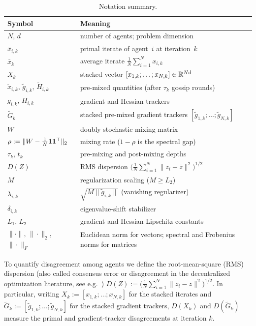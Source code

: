 \documentclass[review,onefignum,onetabnum]{siamart171218}
\begin{document}
	\begin{table}[htbp]
		\centering
		\caption{Notation summary.}
		\label{tab:notation}
		\setlength{\tabcolsep}{4pt}
		\footnotesize
		\begin{tabular}{@{}p{}p{}@{}}
			\toprule
			Symbol & Meaning \\
			\midrule
			$N$, $d$ & number of agents; problem dimension \\
			$x_{i,k}$ & primal iterate of agent~$i$ at iteration~$k$ \\
			$\bar x_k$ & average iterate $\frac1N\sum_{i=1}^N x_{i,k}$ \\
			$X_k$ & stacked vector $[x_{1,k};\dots;x_{N,k}]\in\mathbb{R}^{Nd}$ \\
			$\tilde x_{i,k}$, $\tilde g_{i,k}$, $\tilde H_{i,k}$ & pre-mixed quantities (after $\tau_k$ gossip rounds) \\
			$g_{i,k}$, $H_{i,k}$ & gradient and Hessian trackers \\
			$\tilde G_k$ & stacked pre-mixed gradient trackers $[\tilde g_{1,k};\dots;\tilde g_{N,k}]$ \\
			$W$ & doubly stochastic mixing matrix \\
			$\rho:=\|W-\frac{1}{N}\mathbf{1}\mathbf{1}^\top\|_2$ & mixing rate ($1{-}\rho$ is the spectral gap) \\
			$\tau_k$, $t_k$ & pre-mixing and post-mixing depths \\
			$D(Z)$ & RMS dispersion $\bigl(\frac1N\sum_{i=1}^N\|z_i-\bar z\|^2\bigr)^{1/2}$ \\
			$M$ & regularization scaling ($M\ge L_2$) \\
			$\lambda_{i,k}$ & $\sqrt{M\|\tilde g_{i,k}\|}$ (vanishing regularizer) \\
			$\delta_{i,k}$ & eigenvalue-shift stabilizer \\
			$L_1$, $L_2$ & gradient and Hessian Lipschitz constants \\
			$\|\cdot\|$, $\|\cdot\|_2$, $\|\cdot\|_F$
			& Euclidean norm for vectors; spectral and Frobenius norms for matrices \\
			\bottomrule
		\end{tabular}
	\end{table}
	
	To quantify disagreement among agents we define the root-mean-square (RMS) dispersion
	(also called consensus error or disagreement in the
	decentralized optimization literature, see e.g.\
	\citet{nedic2009subgradient,nedic2017diging})
	\(
	D(Z):=\bigl(\tfrac1N\sum_{i=1}^N\|z_i-\bar z\|^2\bigr)^{1/2}.
	\)
	In particular, writing $X_k:=[x_{1,k};\dots;x_{N,k}]$ for the stacked iterates and
	$\tilde G_k:=[\tilde g_{1,k};\dots;\tilde g_{N,k}]$ for the stacked gradient trackers,
	$D(X_k)$ and $D(\tilde G_k)$ measure the primal and gradient-tracker disagreements at iteration $k$.
	
\end{document}
